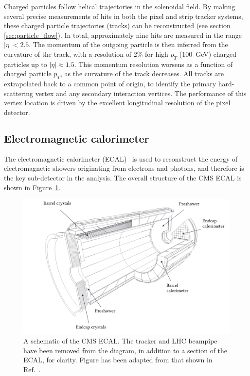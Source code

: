 Charged particles follow helical trajectories in the solenoidal field. By making several precise measurements of hits in both the pixel and strip tracker systems, these charged particle trajectories (tracks) can be reconstructed (see section \ref{sec:particle_flow}). In total, approximately nine hits are measured in the range $|\eta|<2.5$. The momentum of the outgoing particle is then inferred from the curvature of the track, with a resolution of 2\% for high $p_T$ (100~GeV) charged particles up to $|\eta|\approx1.5$. This momentum resolution worsens as a function of charged particle $p_T$, as the curvature of the track decreases. All tracks are extrapolated back to a common point of origin, to identify the primary hard-scattering vertex and any secondary interaction vertices. The performance of this vertex location is driven by the excellent longitudinal resolution of the pixel detector.

\subsection{Electromagnetic calorimeter}\label{sec:cms_ecal}
The electromagnetic calorimeter (ECAL)~\cite{Chatrchyan:2008zzk,Benaglia:1632384,CMS:1997ysd} is used to reconstruct the energy of electromagnetic showers originating from electrons and photons, and therefore is the key sub-detector in the \Hgg analysis. The overall structure of the CMS ECAL is shown in Figure~\ref{fig:cms_ecal}. 

\begin{figure}[htb!]
  \centering
  \includegraphics[width=1\textwidth]{Figures/cms/ecal.pdf}
  \caption[The CMS electromagnetic calorimeter]
  {
    A schematic of the CMS ECAL. The tracker and LHC beampipe have been removed from the diagram, in addition to a section of the ECAL, for clarity. Figure has been adapted from that shown in Ref.~\cite{Chatrchyan:2008zzk}.
  }
  \label{fig:cms_ecal}
\end{figure}

